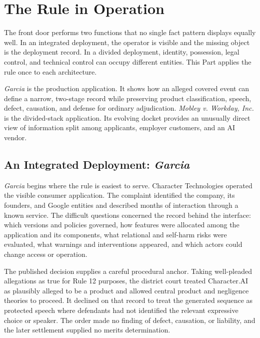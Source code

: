\section{The Rule in Operation}
\label{sec:applications}

The front door performs two functions that no single fact pattern displays equally well. In an integrated deployment, the operator is visible and the missing object is the deployment record. In a divided deployment, identity, possession, legal control, and technical control can occupy different entities. This Part applies the rule once to each architecture.

\emph{Garcia} is the production application. It shows how an alleged covered event can define a narrow, two-stage record while preserving product classification, speech, defect, causation, and defense for ordinary adjudication. \emph{Mobley v. Workday, Inc.} is the divided-stack application. Its evolving docket provides an unusually direct view of information split among applicants, employer customers, and an AI vendor.

\subsection{An Integrated Deployment: \emph{Garcia}}
\label{sec:garcia-application}

\emph{Garcia} begins where the rule is easiest to serve. Character Technologies operated the visible consumer application. The complaint identified the company, its founders, and Google entities and described months of interaction through a known service. The difficult questions concerned the record behind the interface: which versions and policies governed, how features were allocated among the application and its components, what relational and self-harm risks were evaluated, what warnings and interventions appeared, and which actors could change access or operation.

The published decision supplies a careful procedural anchor. Taking well-pleaded allegations as true for Rule 12 purposes, the district court treated Character.AI as plausibly alleged to be a product and allowed central product and negligence theories to proceed. It declined on that record to treat the generated sequence as protected speech where defendants had not identified the relevant expressive choice or speaker. The order made no finding of defect, causation, or liability, and the later settlement supplied no merits determination.


